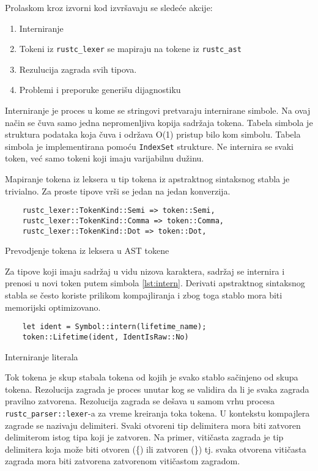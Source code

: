 \documentclass[11pt]{article}
\begin{document}
Prolaskom kroz izvorni kod izvršavaju se sledeće akcije:
\begin{enumerate}
    \item Interniranje 
    \item Tokeni iz \verb|rustc_lexer| se mapiraju na tokene iz \verb|rustc_ast|
    \item Rezulucija zagrada svih tipova.
    \item Problemi i preporuke generišu dijagnostiku 
\end{enumerate}

Interniranje je proces u kome se stringovi pretvaraju internirane simbole. Na ovaj način
se čuva samo jedna nepromenljiva kopija sadržaja tokena. Tabela simbola je struktura podataka
koja čuva i održava O(1) pristup bilo kom simbolu.  Tabela simbola je implementirana pomoću \verb|IndexSet|
strukture. Ne internira se svaki token, već samo tokeni koji imaju varijabilnu dužinu.

Mapiranje tokena iz leksera u tip tokena iz apstraktnog sintaksnog stabla je trivialno.
Za proste tipove vrši se jedan na jedan konverzija.

\begin{listing}[H]
\begin{verbatim}
    rustc_lexer::TokenKind::Semi => token::Semi,
    rustc_lexer::TokenKind::Comma => token::Comma,
    rustc_lexer::TokenKind::Dot => token::Dot,
\end{verbatim}
\caption{Prevodjenje tokena iz leksera u AST tokene}
\end{listing}
Za tipove koji imaju sadržaj u vidu nizova karaktera, sadržaj se internira i prenosi 
u novi token putem simbola \ref{lst:intern}. Derivati apstraktnog sintaksnog stabla se često koriste prilikom kompajliranja i zbog toga 
stablo mora biti memorijski optimizovano.

\begin{listing}[H]
\begin{verbatim}
    let ident = Symbol::intern(lifetime_name);
    token::Lifetime(ident, IdentIsRaw::No)
\end{verbatim}
\caption{Interniranje literala}
\label{lst:intern}
\end{listing}
Tok tokena je skup stabala tokena od kojih je svako stablo sačinjeno od skupa tokena.  
Rezolucija zagrada je proces unutar kog se validira da li je svaka zagrada pravilno zatvorena.
Rezolucija zagrada se dešava u samom vrhu procesa \verb|rustc_parser::lexer|-a 
za vreme kreiranja toka tokena. U kontekstu kompajlera zagrade se nazivaju delimiteri. 
Svaki otvoreni tip delimitera mora biti zatvoren delimiterom istog tipa koji je zatvoren.
Na primer, vitičasta zagrada je tip delimitera koja može biti otvoren (\{) ili zatvoren (\}) tj.
svaka otvorena vitičasta zagrada mora biti zatvorena zatvorenom vitičastom zagradom.
\end{document}
